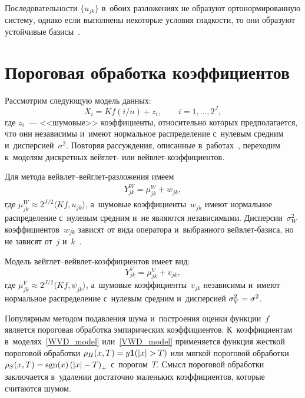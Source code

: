 \begin{multicols}{2}
Последовательности $\{u_{jk}\}$ в~обоих разложениях не образуют 
ортонормированную систему,
однако если выполнены некоторые условия гладкости, то они образуют
устойчивые базисы~\cite{Lee97, KS11}.



\section{Пороговая обработка коэффициентов}


Рассмотрим следующую модель данных:
\begin{equation*}
X_i = K f(i/n) + z_i, \qquad i = 1, \ldots, 2^J,
\end{equation*}
где $z_{i}$~--- <<шумовые>> коэффициенты, относительно которых
 предполагается, что они независимы и~имеют нормальное распределение 
 с~нулевым средним и~дисперсией~$\sigma^2$. Повторяя рассуждения, описанные 
 в~работах~\cite{ESH14-1, EKS15}, переходим к~моделям дискретных вейглет- или 
 вейв\-лет-ко\-эф\-фи\-ци\-ентов.


Для метода вейв\-лет--вейг\-лет-раз\-ло\-же\-ния имеем
\begin{equation}                                                                         \label{WVD_model}
\begin{split}
Y^{W}_{jk} = \mu^{W}_{jk} +  w_{jk},
\end{split}
\end{equation}
где $\mu^{W}_{jk}\approx 2^{J/2}\langle K f, u_{jk}\rangle$, 
а~шумовые коэффициенты~$w_{jk}$ имеют нормальное распределение с~нулевым средним 
и~не являются независимыми. Дис\-пер\-сии~$\sigma_W^2$ коэффициентов~$w_{jk}$ 
зависят от вида оператора и~выбранного вейв\-лет-ба\-зи\-са, но не зависят от~$j$ 
и~$k$~\cite{JS97, J99}.

Модель вейглет--вейв\-лет-ко\-эф\-фи\-ци\-ен\-тов имеет вид:
\begin{equation}                                              
\label{VWD_model}
Y^{V}_{jk} = \mu^{V}_{jk} +   v_{jk},
\end{equation}
где $\mu^{V}_{jk}\approx 2^{J/2}\langle Kf,\psi_{jk}\rangle$, 
а~шумовые коэффициенты~$v_{jk}$ независимы и~имеют нормальное распределение с~нулевым 
средним и~дисперсией $\sigma_V^2\hm=\sigma^2$.

Популярным методом подавления шума и~построения оценки функции~$f$ 
является пороговая обработка эмпирических коэффициентов. 
К~коэффициентам в~моделях~\eqref{WVD_model} или~\eqref{VWD_model} 
применяется функция жесткой пороговой обработки 
$\rho_{H}(x,T)\hm=y\mathbf{1}(\abs{x}\hm>T)$ или мягкой пороговой 
обработки $\rho_{S}(x,T)\hm=\mathrm{sgn}(x)\left(\abs{x}-T\right)_{+}$ с~порогом~$T$. 
Смысл пороговой обработки заключается в~удалении достаточно маленьких
 коэффициентов, которые считаются шумом.


\end{multicols}
